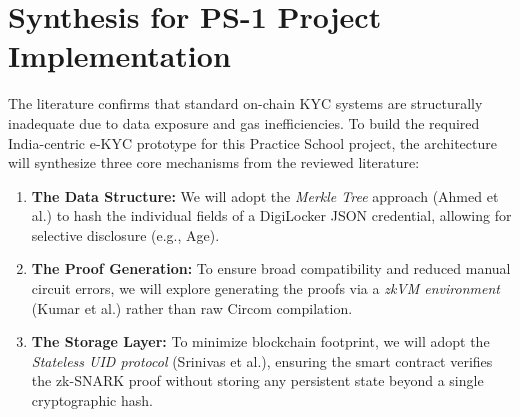 \documentclass[12pt, a4paper]{article}
\begin{document}
\section{Synthesis for PS-1 Project Implementation}
The literature confirms that standard on-chain KYC systems are structurally inadequate due to data exposure and gas inefficiencies. To build the required India-centric e-KYC prototype for this Practice School project, the architecture will synthesize three core mechanisms from the reviewed literature:
\begin{enumerate}
    \item \textbf{The Data Structure:} We will adopt the \textit{Merkle Tree} approach (Ahmed et al.) to hash the individual fields of a DigiLocker JSON credential, allowing for selective disclosure (e.g., Age).
    \item \textbf{The Proof Generation:} To ensure broad compatibility and reduced manual circuit errors, we will explore generating the proofs via a \textit{zkVM environment} (Kumar et al.) rather than raw Circom compilation.
    \item \textbf{The Storage Layer:} To minimize blockchain footprint, we will adopt the \textit{Stateless UID protocol} (Srinivas et al.), ensuring the smart contract verifies the zk-SNARK proof without storing any persistent state beyond a single cryptographic hash.
\end{enumerate}
\end{document}
